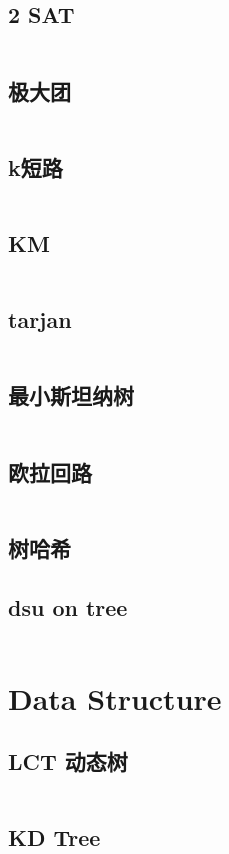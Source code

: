 \documentclass[titlepage, a4paper]{article}
\begin{document}
\begin{multicols}{2}
\begin{spacing}{0.6}
				\subsection{2 SAT}
					\inputminted{cpp}{src/Graph/2-SAT.cpp}
				\subsection{极大团}
					\inputminted{cpp}{src/Graph/极大团.cpp}
				\subsection{k短路}
					\inputminted{cpp}{src/Graph/k短路.cpp}
				\subsection{KM}
					\inputminted{cpp}{src/Graph/KM.cpp}
				\subsection{tarjan}
					\inputminted{cpp}{src/Graph/tarjan.cpp}
				\subsection{最小斯坦纳树}
					\inputminted{cpp}{src/Graph/最小斯坦纳树.cpp}
				\subsection{欧拉回路}
					\inputminted{cpp}{src/Graph/欧拉回路.cpp}
				\subsection{树哈希}	
					
				\subsection{dsu on tree}
					\inputminted{cpp}{src/Graph/dsu_on_tree.cpp}
			\newpage
			\section{Data Structure}
				\subsection{LCT 动态树}
					\inputminted{cpp}{src/DataStructure/LCT.cpp}
				\subsection{KD Tree}
					\inputminted{cpp}{src/DataStructure/KDT1.cpp}
					\inputminted{cpp}{src/DataStructure/KDT2.cpp}

\end{spacing}
\end{multicols}
\end{document}
